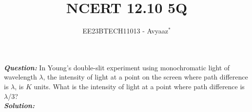 \documentclass[journal,12pt,twocolumn]{IEEEtran}
\theoremstyle{remark}
\begin{document}

\vspace{3cm}

\title{NCERT 12.10 5Q}
\author{EE23BTECH11013 - Avyaaz$^{*}$%
}
\maketitle
\newpage
\bigskip

\renewcommand{\thefigure}{\theenumi}
\renewcommand{\thetable}{\arabic{table}}

\large\textbf{\textsl{Question:}}
In Young’s double-slit experiment using monochromatic light of wavelength $\lambda$, the intensity of light at a point on the screen where path difference is $\lambda$, is $K$ units. What is the intensity of light at a
point where path difference is $\lambda$/3?\\
\large\textbf{\textsl{Solution:}}
\begin{table}[htbp]
\centering

\vspace{0.2cm}
\caption{\normalsize $Parameters$}
\label{tab:parameters}
\end{table}





\end{document}
